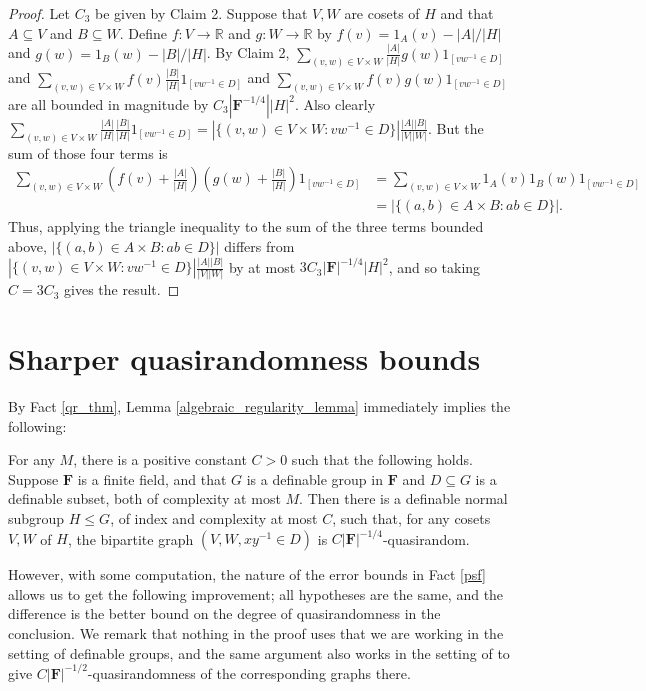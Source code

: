\documentclass[10pt]{article}
\begin{document}
{\begin{proof}
Let $C_3$ be given by Claim 2. Suppose that $V,W$ are cosets of $H$ and that $A\subseteq V$ and $B\subseteq W$. Define $f:V\to \mathbb{R}$ and $g:W\to\mathbb{R}$ by $f(v)=1_{A}(v)-|A|/|H|$ and $g(w)=1_{B}(w)-|B|/|H|$. By Claim 2, $\sum_{(v,w)\in V\times W}\frac{|A|}{|H|}g(w)1_{[vw^{-1}\in D]}$ and $\sum_{(v,w)\in V\times W}f(v)\frac{|B|}{|H|}1_{[vw^{-1}\in D]}$ and $\sum_{(v,w)\in V\times W}f(v)g(w)1_{[vw^{-1}\in D]}$ are all bounded in magnitude by $C_3|\mathbf{F}^{-1/4}||H|^2$. Also clearly $\sum_{(v,w)\in V\times W}\frac{|A|}{|H|}\frac{|B|}{|H|}1_{[vw^{-1}\in D]}=|\{(v,w)\in V\times W:vw^{-1}\in D\}|\frac{|A||B|}{|V||W|}$. But the sum of those four terms is 
\begin{align*}\sum_{(v,w)\in V\times W}\left(f(v)+\frac{|A|}{|H|}\right)\left(g(w)+\frac{|B|}{|H|}\right)1_{[vw^{-1}\in D]}&=\sum_{(v,w)\in V\times W}1_A(v)1_B(w)1_{[vw^{-1}\in D]}\\&=|\{(a,b)\in A\times B:ab\in D\}|.
\end{align*}Thus, applying the triangle inequality to the sum of the three terms bounded above, $|\{(a,b)\in A\times B:ab\in D\}|$ differs from $|\{(v,w)\in V\times W:vw^{-1}\in D\}|\frac{|A||B|}{|V||W|}$ by at most $3C_3|\mathbf{F}|^{-1/4}|H|^2$, and so taking $C=3C_3$ gives the result.
\end{proof}

\section{Sharper quasirandomness bounds}
By Fact \ref{qr_thm}, Lemma \ref{algebraic_regularity_lemma} immediately implies the following:

\begin{lemma}\label{qr_weak_bound}
    For any $M$, there is a positive constant $C>0$ such that the following holds. Suppose $\mathbf{F}$ is a finite field, and that $G$ is a definable group in $\mathbf{F}$ and $D\subseteq G$ is a definable subset, both of complexity at most $M$. Then there is a definable normal subgroup $H\leqslant G$, of index and complexity at most $C$, such that, for any cosets $V,W$ of $H$, the bipartite graph $(V,W,xy^{-1}\in D)$ is $C|\mathbf{F}|^{-1/4}$-quasirandom.
\end{lemma}

However, with some computation, the nature of the error bounds in Fact \ref{psf} allows us to get the following improvement; all hypotheses are the same, and the difference is the better bound on the degree of quasirandomness in the conclusion. We remark that nothing in the proof uses that we are working in the setting of definable groups, and the same argument also works in the setting of \cite{tao} to give $C|\mathbf{F}|^{-1/2}$-quasirandomness of the corresponding graphs there.

}
\end{document}
